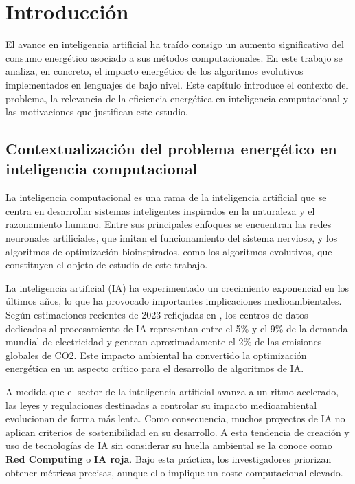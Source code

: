\chapter{Introducción}

El avance en inteligencia artificial ha traído consigo un aumento significativo del consumo energético asociado a sus métodos computacionales. En este trabajo se analiza, en concreto, el impacto energético de los algoritmos evolutivos implementados en lenguajes de bajo nivel. Este capítulo introduce el contexto del problema, la relevancia de la eficiencia energética en inteligencia computacional y las motivaciones que justifican este estudio.

\section{Contextualización del problema energético en inteligencia computacional}

La inteligencia computacional es una rama de la inteligencia artificial que se centra en desarrollar sistemas inteligentes inspirados en la naturaleza y el razonamiento humano. Entre sus principales enfoques se encuentran las redes neuronales artificiales, que imitan el funcionamiento del sistema nervioso, y los algoritmos de optimización bioinspirados, como los algoritmos evolutivos, que constituyen el objeto de estudio de este trabajo. \cite{dasci_ic}

La inteligencia artificial (IA) ha experimentado un crecimiento exponencial en los últimos años, lo que ha provocado importantes implicaciones medioambientales. Según estimaciones recientes de 2023 reflejadas en \cite{cotta2024consumo}, los centros de datos dedicados al procesamiento de IA representan entre el 5\% y el 9\% de la demanda mundial de electricidad y generan aproximadamente el 2\% de las emisiones globales de CO2. Este impacto ambiental ha convertido la optimización energética en un aspecto crítico para el desarrollo de algoritmos de IA.

A medida que el sector de la inteligencia artificial avanza a un ritmo acelerado, las leyes y regulaciones destinadas a controlar su impacto medioambiental evolucionan de forma más lenta. Como consecuencia, muchos proyectos de IA no aplican criterios de sostenibilidad en su desarrollo. A esta tendencia de creación y uso de tecnologías de IA sin considerar su huella ambiental se la conoce como \textbf{Red Computing} o \textbf{IA roja}. Bajo esta práctica, los investigadores priorizan obtener métricas precisas, aunque ello implique un coste computacional elevado.

